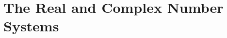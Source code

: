 \documentclass[class=mike-apostol-mathematical-analysis,crop=false]{standalone}
\begin{document}
\chapter{The Real and Complex Number Systems}
\end{document}
